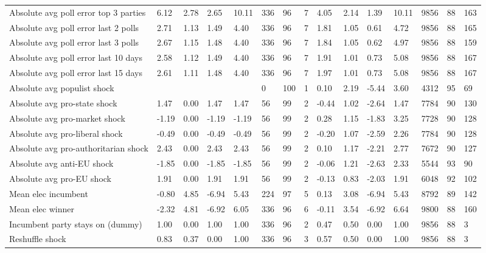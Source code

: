 \begin{longtable}{lllllllllllllll}
Absolute avg poll error top 3 parties & 6.12 & 2.78 & 2.65 & 10.11 & 336 & 96 & 7 & 4.05 & 2.14 & 1.39 & 10.11 & 9856 & 88 & 163\\
\addlinespace
Absolute avg poll error last 2 polls & 2.71 & 1.13 & 1.49 & 4.40 & 336 & 96 & 7 & 1.81 & 1.05 & 0.61 & 4.72 & 9856 & 88 & 165\\
Absolute avg poll error last 3 polls & 2.67 & 1.15 & 1.48 & 4.40 & 336 & 96 & 7 & 1.84 & 1.05 & 0.62 & 4.97 & 9856 & 88 & 159\\
Absolute avg poll error last 10 days & 2.58 & 1.12 & 1.49 & 4.40 & 336 & 96 & 7 & 1.91 & 1.01 & 0.73 & 5.08 & 9856 & 88 & 167\\
Absolute avg poll error last 15 days & 2.61 & 1.11 & 1.48 & 4.40 & 336 & 96 & 7 & 1.97 & 1.01 & 0.73 & 5.08 & 9856 & 88 & 167\\
Absolute avg populist shock &  &  &  &  & 0 & 100 & 1 & 0.10 & 2.19 & -5.44 & 3.60 & 4312 & 95 & 69\\
\addlinespace
Absolute avg pro-state shock & 1.47 & 0.00 & 1.47 & 1.47 & 56 & 99 & 2 & -0.44 & 1.02 & -2.64 & 1.47 & 7784 & 90 & 130\\
Absolute avg pro-market shock & -1.19 & 0.00 & -1.19 & -1.19 & 56 & 99 & 2 & 0.28 & 1.15 & -1.83 & 3.25 & 7728 & 90 & 128\\
Absolute avg pro-liberal shock & -0.49 & 0.00 & -0.49 & -0.49 & 56 & 99 & 2 & -0.20 & 1.07 & -2.59 & 2.26 & 7784 & 90 & 128\\
Absolute avg pro-authoritarian shock & 2.43 & 0.00 & 2.43 & 2.43 & 56 & 99 & 2 & 0.10 & 1.17 & -2.21 & 2.77 & 7672 & 90 & 127\\
Absolute avg anti-EU shock & -1.85 & 0.00 & -1.85 & -1.85 & 56 & 99 & 2 & -0.06 & 1.21 & -2.63 & 2.33 & 5544 & 93 & 90\\
\addlinespace
Absolute avg pro-EU shock & 1.91 & 0.00 & 1.91 & 1.91 & 56 & 99 & 2 & -0.13 & 0.83 & -2.03 & 1.91 & 6048 & 92 & 102\\
Mean elec incumbent & -0.80 & 4.85 & -6.94 & 5.43 & 224 & 97 & 5 & 0.13 & 3.08 & -6.94 & 5.43 & 8792 & 89 & 142\\
Mean elec winner & -2.32 & 4.81 & -6.92 & 6.05 & 336 & 96 & 6 & -0.11 & 3.54 & -6.92 & 6.64 & 9800 & 88 & 160\\
Incumbent party stays on (dummy) & 1.00 & 0.00 & 1.00 & 1.00 & 336 & 96 & 2 & 0.47 & 0.50 & 0.00 & 1.00 & 9856 & 88 & 3\\
Reshuffle shock & 0.83 & 0.37 & 0.00 & 1.00 & 336 & 96 & 3 & 0.57 & 0.50 & 0.00 & 1.00 & 9856 & 88 & 3\\

\end{longtable}
